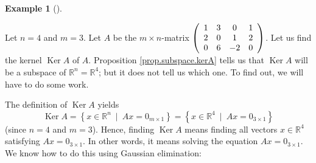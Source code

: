 \documentclass[numbers=enddot,12pt,final,onecolumn,notitlepage]{scrartcl}%
\theoremstyle{definition}
\newtheorem{exam}[theo]{Example}
\newenvironment{example}[1][]
{\begin{exam}[#1]\begin{leftbar}}
{\end{leftbar}\end{exam}}
\begin{document}
\begin{example}
\label{exam.kernel.1}Let $n=4$ and $m=3$. Let $A$ be the $m\times n$-matrix
$\left(
\begin{array}
[c]{cccc}%
1 & 3 & 0 & 1\\
2 & 0 & 1 & 2\\
0 & 6 & -2 & 0
\end{array}
\right)  $. Let us find the kernel $\operatorname*{Ker}A$ of $A$. Proposition
\ref{prop.subspace.kerA} tells us that $\operatorname*{Ker}A$ will be a
subspace of $\mathbb{R}^{n}=\mathbb{R}^{4}$; but it does not tell us which
one. To find out, we will have to do some work.

The definition of $\operatorname*{Ker}A$ yields%
\[
\operatorname*{Ker}A=\left\{  x\in\mathbb{R}^{n}\ \mid\ Ax=0_{m\times
1}\right\}  =\left\{  x\in\mathbb{R}^{4}\ \mid\ Ax=0_{3\times1}\right\}
\]
(since $n=4$ and $m=3$). Hence, finding $\operatorname*{Ker}A$ means finding
all vectors $x\in\mathbb{R}^{4}$ satisfying $Ax=0_{3\times1}$. In other words,
it means solving the equation $Ax=0_{3\times1}$. We know how to do this using
Gaussian elimination:


\end{example}
\end{document}
